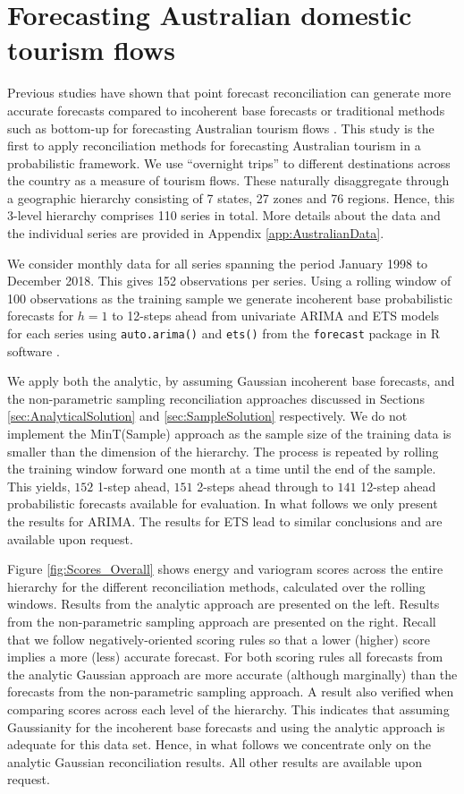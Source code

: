 \documentclass[12pt]{article}
\theoremstyle{definition}
\begin{document}
\section{Forecasting Australian domestic tourism flows}\label{sec:Application}

Previous studies have shown that point forecast reconciliation can generate more accurate forecasts compared to incoherent base forecasts or traditional methods such as bottom-up for forecasting Australian tourism flows \citep[see for example,][]{AthEtAl2009, HynEtAl2011, WicEtAl2019}. This study is the first to apply reconciliation methods for forecasting Australian tourism in a probabilistic framework. We use ``overnight trips'' to different destinations across the country as a measure of tourism flows. These naturally disaggregate through a geographic hierarchy consisting of 7 states, 27 zones and 76 regions. Hence, this 3-level hierarchy comprises 110 series in total. More details about the data and the individual series are provided in Appendix \ref{app:AustralianData}.

We consider monthly data for all series spanning the period January 1998 to December 2018. This gives 152 observations per series. Using a rolling window of 100 observations as the training sample we generate incoherent base probabilistic forecasts for $h=1$ to 12-steps ahead from univariate ARIMA and ETS models for each series using \verb|auto.arima()| and \verb|ets()| from the \verb|forecast| package \citep{Rforecast} in R software \citep{Rcore}.

We apply both the analytic, by assuming Gaussian incoherent base forecasts, and the non-parametric sampling reconciliation approaches discussed in Sections \ref{sec:AnalyticalSolution} and \ref{sec:SampleSolution} respectively. We do not implement the MinT(Sample) approach as the sample size of the training data is smaller than the dimension of the hierarchy. The process is repeated by rolling the training window forward one month at a time until the end of the sample. This yields, $152$ 1-step ahead, $151$ 2-steps ahead through to $141$ 12-step ahead probabilistic forecasts available for evaluation. In what follows we only present the results for ARIMA. The results for ETS lead to similar conclusions and are available upon request.

Figure \ref{fig:Scores_Overall} shows energy and variogram scores across the entire hierarchy for the different reconciliation methods, calculated over the rolling windows. Results from the analytic approach are presented on the left. Results from the non-parametric sampling approach are presented on the right. Recall that we follow negatively-oriented scoring rules so that a lower (higher) score implies a more (less) accurate forecast. For both scoring rules all forecasts from the analytic Gaussian approach are more accurate (although marginally) than the forecasts from the non-parametric sampling approach. A result also verified when comparing scores across each level of the hierarchy. This indicates that assuming Gaussianity for the incoherent base forecasts and using the analytic approach is adequate for this data set. Hence, in what follows we concentrate only on the analytic Gaussian reconciliation results. All other results are available upon request.
\end{document}
